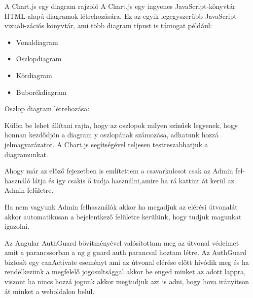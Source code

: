 A Chart.js\cite{Chartjs2} egy diagram rajzoló A Chart.js egy ingyenes JavaScript-könyvtár HTML-alapú diagramok létrehozására. Ez az egyik legegyszerűbb JavaScript vizuali-zációs könyvtár, ami több diagram típust is támogat például:

\begin{itemize}
\item Vonaldiagram
\item Oszlopdiagram
\item Kördiagram
\item Buborékdiagram
\end{itemize}

Oszlop diagram létrehozása:

Külön be lehet állítani rajta, hogy az oszlopok milyen színűek legyenek, hogy honnan kezdődjön a diagram y oszlopának számozása, adhatunk hozzá jelmagyarázatot. A Chart.js segítségével teljesen testreszabhatjuk a diagramunkat.

Ahogy már az előző fejezetben is említettem a csavarkulcsot csak az Admin fel-
használó látja és így csakis ő tudja használni,amire ha rá kattint át kerül az Admin felületre.

Ha nem vagyunk Admin felhasználók akkor ha megadjuk az elérési útvonalát akkor automatikusan a bejelentkező felületre kerülünk, hogy tudjuk magunkat igazolni.

Az Angular AuthGuard bővítményével valósítottam meg az útvonal védelmet amit a parancssorban a ng g guard auth parancsal hoztam létre.
Az AuthGuard biztosít egy canActivate eseményt ami az útvonal elérése előtt hívódik meg és ha rendelkezünk a megfelelő jogosultsággal akkor be enged minket az adott lappra, viszont ha nincs hozzá jogunk akkor megtudjuk azt is adni, hogy hova irányítson át minket a weboldalon belül.

